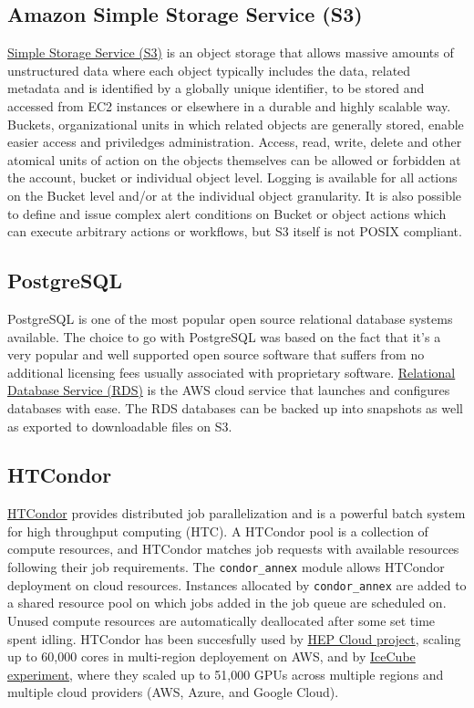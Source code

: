 \subsection{Amazon Simple Storage Service (S3)}
\href{https://aws.amazon.com/s3/}{Simple Storage Service (S3)} is an object storage that allows massive amounts of unstructured data where each object typically includes the data, related metadata and is identified by a globally unique identifier, to be stored and accessed from EC2 instances or elsewhere in a durable and highly scalable way.
Buckets, organizational units in which related objects are generally stored, enable easier access and priviledges administration. Access, read, write, delete and other atomical units of action on the objects themselves can be allowed or forbidden at the account, bucket or individual object level. Logging is available for all actions on the Bucket level and/or at the individual object granularity. It is also possible to define and issue complex alert conditions on Bucket or object actions which can execute arbitrary actions or workflows, but S3 itself is not POSIX compliant.
\subsection{PostgreSQL}
PostgreSQL is one of the most popular open source relational database systems available. The choice to go with PostgreSQL was based on the fact that it's a very popular and well supported open source software that suffers from no additional licensing fees usually associated with proprietary software. \href{https://aws.amazon.com/rds/}{Relational Database Service (RDS)} is the AWS cloud service that launches and configures databases with ease.
The RDS databases can be backed up into snapshots as well as exported to downloadable files on S3.
\subsection{HTCondor}
\href{https://research.cs.wisc.edu/htcondor}{HTCondor}\citep{condor-practice} provides distributed job parallelization and is a powerful batch system for high throughput computing (HTC).
A HTCondor pool is a collection of compute resources, and HTCondor matches job requests with available resources following their job requirements.
The \texttt{condor\_annex} module allows HTCondor deployment on cloud resources. Instances allocated by \texttt{condor\_annex} are added to a shared resource pool on which jobs added in the job queue are scheduled on. Unused compute resources are automatically deallocated after some set time spent idling.
HTCondor has been succesfully used by \href{https://aws.amazon.com/blogs/aws/experiment-that-discovered-the-higgs-boson-uses-aws-to-probe-nature}{HEP Cloud project}, scaling up to 60,000 cores in multi-region deployement on AWS, and by \href{https://www.linkedin.com/pulse/using-50k-gpus-across-multiple-clouds-icecube-science-igor-sfiligoi}{IceCube experiment}, where they scaled up to 51,000 GPUs across multiple regions and multiple cloud providers (AWS, Azure, and Google Cloud).
